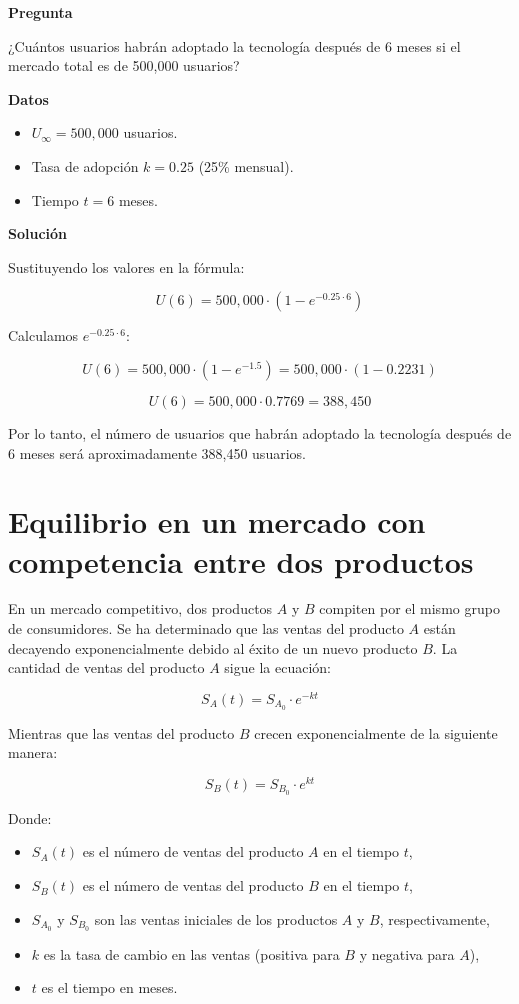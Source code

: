\documentclass{article}
\begin{document}
\textbf{Pregunta}

¿Cuántos usuarios habrán adoptado la tecnología después de 6 meses si el mercado total es de 500,000 usuarios?

\textbf{Datos}

\begin{itemize}
    \item \( U_{\infty} = 500,000 \) usuarios.
    \item Tasa de adopción \( k = 0.25 \) (25\% mensual).
    \item Tiempo \( t = 6 \) meses.
\end{itemize}

\textbf{Solución}

Sustituyendo los valores en la fórmula:

\[
U(6) = 500,000 \cdot \left(1 - e^{-0.25 \cdot 6}\right)
\]

Calculamos \( e^{-0.25 \cdot 6} \):

\[
U(6) = 500,000 \cdot \left(1 - e^{-1.5}\right) = 500,000 \cdot \left(1 - 0.2231\right)
\]

\[
U(6) = 500,000 \cdot 0.7769 = 388,450
\]

Por lo tanto, el número de usuarios que habrán adoptado la tecnología después de 6 meses será aproximadamente 388,450 usuarios.

\section{Equilibrio en un mercado con competencia entre dos productos}

En un mercado competitivo, dos productos \( A \) y \( B \) compiten por el mismo grupo de consumidores. Se ha determinado que las ventas del producto \( A \) están decayendo exponencialmente debido al éxito de un nuevo producto \( B \). La cantidad de ventas del producto \( A \) sigue la ecuación:

\[
S_A(t) = S_{A_0} \cdot e^{-kt}
\]

Mientras que las ventas del producto \( B \) crecen exponencialmente de la siguiente manera:

\[
S_B(t) = S_{B_0} \cdot e^{kt}
\]

Donde:
\begin{itemize}
    \item \( S_A(t) \) es el número de ventas del producto \( A \) en el tiempo \( t \),
    \item \( S_B(t) \) es el número de ventas del producto \( B \) en el tiempo \( t \),
    \item \( S_{A_0} \) y \( S_{B_0} \) son las ventas iniciales de los productos \( A \) y \( B \), respectivamente,
    \item \( k \) es la tasa de cambio en las ventas (positiva para \( B \) y negativa para \( A \)),
    \item \( t \) es el tiempo en meses.
\end{itemize}
\end{document}
